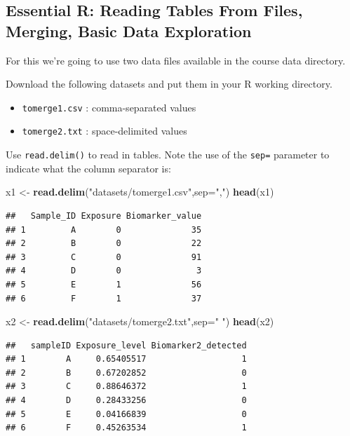 \documentclass[
]{book}
\newenvironment{Shaded}{\begin{snugshade}}{\end{snugshade}}
\newcommand{\AttributeTok}[1]{\textcolor[rgb]{0.13,0.29,0.53}{#1}}
\newcommand{\FunctionTok}[1]{\textcolor[rgb]{0.13,0.29,0.53}{\textbf{#1}}}
\newcommand{\NormalTok}[1]{#1}
\newcommand{\OtherTok}[1]{\textcolor[rgb]{0.56,0.35,0.01}{#1}}
\newcommand{\StringTok}[1]{\textcolor[rgb]{0.31,0.60,0.02}{#1}}
\providecommand{\tightlist}{%
  \setlength{\itemsep}{0pt}\setlength{\parskip}{0pt}}
\begin{document}
\subsection{Essential R: Reading Tables From Files, Merging, Basic Data Exploration}\label{essential-r-reading-tables-from-files-merging-basic-data-exploration}

For this we're going to use two data files available in the course data directory.

Download the following datasets and put them in your R working directory.

\begin{itemize}
\tightlist
\item
  \texttt{tomerge1.csv} : comma-separated values
\item
  \texttt{tomerge2.txt} : space-delimited values
\end{itemize}

Use \texttt{read.delim()} to read in tables. Note the use of the \texttt{sep=} parameter to indicate what the column separator is:

\begin{Shaded}
\begin{Highlighting}[]
\NormalTok{x1 }\OtherTok{\textless{}{-}} \FunctionTok{read.delim}\NormalTok{(}\StringTok{"datasets/tomerge1.csv"}\NormalTok{,}\AttributeTok{sep=}\StringTok{","}\NormalTok{)}
\FunctionTok{head}\NormalTok{(x1)}
\end{Highlighting}
\end{Shaded}

\begin{verbatim}
##   Sample_ID Exposure Biomarker_value
## 1         A        0              35
## 2         B        0              22
## 3         C        0              91
## 4         D        0               3
## 5         E        1              56
## 6         F        1              37
\end{verbatim}

\begin{Shaded}
\begin{Highlighting}[]
\NormalTok{x2 }\OtherTok{\textless{}{-}} \FunctionTok{read.delim}\NormalTok{(}\StringTok{"datasets/tomerge2.txt"}\NormalTok{,}\AttributeTok{sep=}\StringTok{" "}\NormalTok{)}
\FunctionTok{head}\NormalTok{(x2)}
\end{Highlighting}
\end{Shaded}

\begin{verbatim}
##   sampleID Exposure_level Biomarker2_detected
## 1        A     0.65405517                   1
## 2        B     0.67202852                   0
## 3        C     0.88646372                   1
## 4        D     0.28433256                   0
## 5        E     0.04166839                   0
## 6        F     0.45263534                   1
\end{verbatim}
\end{document}
